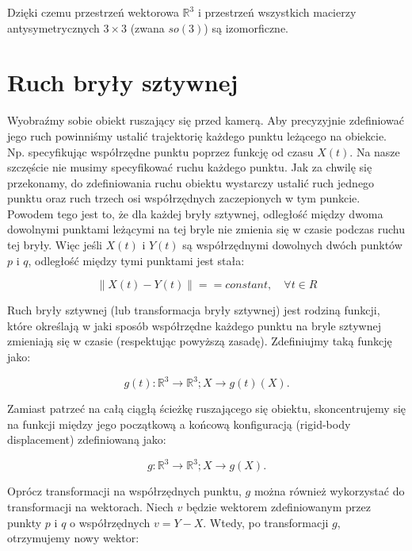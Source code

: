 \documentclass[a4paper,12pt]{article}
\newcommand{\RR}{\mathbb{R}^3}
\begin{document}
Dzięki czemu przestrzeń wektorowa $\RR$ i przestrzeń wszystkich macierzy antysymetrycznych $3 \times 3$ (zwana $so(3)$) są izomorficzne.

\section{Ruch bryły sztywnej}

\indent \indent Wyobraźmy sobie obiekt ruszający się przed kamerą. Aby precyzyjnie zdefiniować jego ruch powinniśmy ustalić trajektorię każdego punktu leżącego na obiekcie. Np. specyfikując współrzędne punktu poprzez funkcję od czasu $X(t)$. Na nasze szczęście nie musimy specyfikować ruchu każdego punktu. Jak za chwilę się przekonamy, do zdefiniowania ruchu obiektu wystarczy ustalić ruch jednego punktu oraz ruch trzech osi współrzędnych zaczepionych w tym punkcie. Powodem tego jest to, że dla każdej bryły sztywnej, odległość między dwoma dowolnymi punktami leżącymi na tej bryle nie zmienia się w czasie podczas ruchu tej bryły. Więc jeśli $X(t)$ i $Y(t)$ są współrzędnymi dowolnych dwóch punktów $p$ i $q$, odległość między tymi punktami jest stała:

\begin{equation}
\| X(t) - Y(t) \| == constant, \quad \forall t \in R
\end{equation}

Ruch bryły sztywnej (lub transformacja bryły sztywnej) jest rodziną funkcji, które określają w jaki sposób współrzędne każdego punktu na bryle sztywnej zmieniają się w czasie (respektując powyższą zasadę). Zdefiniujmy taką funkcję jako:

\begin{equation}
g(t): \RR \rightarrow \RR; X \rightarrow g(t)(X).
\end{equation}

Zamiast patrzeć na całą ciągłą ścieżkę ruszającego się obiektu, skoncentrujemy się na funkcji między jego początkową a końcową konfiguracją (rigid-body displacement) zdefiniowaną jako:

\begin{equation}
g: \RR \rightarrow \RR; X \rightarrow g(X).
\end{equation}

Oprócz transformacji na współrzędnych punktu, $g$ można również wykorzystać do transformacji na wektorach. Niech $v$ będzie wektorem zdefiniowanym przez punkty $p$ i $q$ o współrzędnych $v = Y - X$. Wtedy, po transformacji $g$, otrzymujemy nowy wektor:
\end{document}
